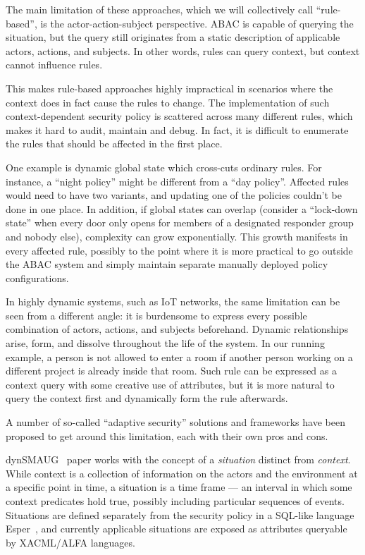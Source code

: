 \medskip

The main limitation of these approaches, which we will collectively call ``rule-based'',
is the actor-action-subject perspective. ABAC is capable of querying the situation, but
the query still originates from a static description of applicable actors, actions, and
subjects. In other words, rules can query context, but context cannot influence rules.

This makes rule-based approaches highly impractical in scenarios where the context does
in fact cause the rules to change. The implementation of such context-dependent security
policy is scattered across many different rules, which makes it hard to audit, maintain
and debug. In fact, it is difficult to enumerate the rules that should be affected in
the first place.

One example is dynamic global state which cross-cuts ordinary rules. For instance, a
``night policy'' might be different from a ``day policy''. Affected rules would need to
have two variants, and updating one of the policies couldn't be done in one place. In
addition, if global states can overlap (consider a ``lock-down state'' when every door
only opens for members of a designated responder group and nobody else), complexity can
grow exponentially. This growth manifests in every affected rule, possibly to the point
where it is more practical to go outside the ABAC system and simply maintain separate
manually deployed policy configurations.

In highly dynamic systems, such as IoT networks, the same limitation can be seen from a
different angle: it is burdensome to express every possible combination of actors,
actions, and subjects beforehand. Dynamic relationships arise, form, and dissolve
throughout the life of the system. In our running example, a person is not allowed to
enter a room if another person working on a different project is already inside that
room. Such rule can be expressed as a context query with some creative use of
attributes, but it is more natural to query the context first and dynamically form the
rule afterwards.

\medskip

A number of so-called ``adaptive security'' solutions and frameworks have been proposed
to get around this limitation, each with their own pros and cons.

dynSMAUG~\citep{dynsmaug2017} paper works with the concept of a \textit{situation}
distinct from \textit{context}. While context is a collection of information on the
actors and the environment at a specific point in time, a situation is a time frame ---
an interval in which some context predicates hold true, possibly including particular
sequences of events. Situations are defined separately from the security policy in a
SQL-like language Esper~\citep{esper}, and currently applicable situations are exposed
as attributes queryable by XACML/ALFA languages.

